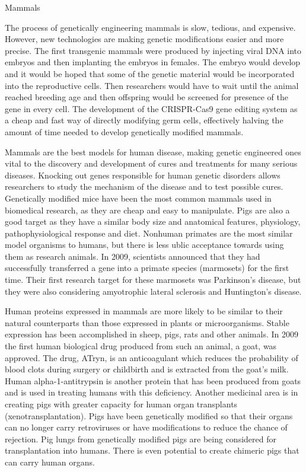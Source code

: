 Mammals

The process of genetically engineering mammals is slow, tedious, and expensive. However, new technologies are making genetic modifications easier and more precise. The first transgenic mammals were produced by injecting viral DNA into embryos and then implanting the embryos in females. The embryo would develop and it would be hoped that some of the genetic material would be incorporated into the reproductive cells. Then researchers would have to wait until the animal reached breeding age and then offspring would be screened for presence of the gene in every cell. The development of the CRISPR-Cas9 gene editing system as a cheap and fast way of directly modifying germ cells, effectively halving the amount of time needed to develop genetically modified mammals.

Mammals are the best models for human disease, making genetic engineered ones vital to the discovery and development of cures and treatments for many serious diseases. Knocking out genes responsible for human genetic disorders allows researchers to study the mechanism of the disease and to test possible cures. Genetically modified mice have been the most common mammals used in biomedical research, as they are cheap and easy to manipulate. Pigs are also a good target as they have a similar body size and anatomical features, physiology, pathophysiological response and diet. Nonhuman primates are the most similar model organisms to humans, but there is less ublic acceptance towards using them as research animals. In 2009, scientists announced that they had successfully transferred a gene into a primate species (marmosets) for the first time. Their first research target for these marmosets was Parkinson's disease, but they were also considering amyotrophic lateral sclerosis and Huntington's disease.

Human proteins expressed in mammals are more likely to be similar to their natural counterparts than those expressed in plants or microorganisms. Stable expression has been accomplished in sheep, pigs, rats and other animals. In 2009 the first human biological drug produced from such an animal, a goat, was approved. The drug, ATryn, is an anticoagulant which reduces the probability of blood clots during surgery or childbirth and is extracted from the goat's milk. Human alpha-1-antitrypsin is another protein that has been produced from goats and is used in treating humans with this deficiency. Another medicinal area is in creating pigs with greater capacity for human organ transplants (xenotransplantation). Pigs have been genetically modified so that their organs can no longer carry retroviruses or have modifications to reduce the chance of rejection. Pig lungs from genetically modified pigs are being considered for transplantation into humans. There is even potential to create chimeric pigs that can carry human organs.

